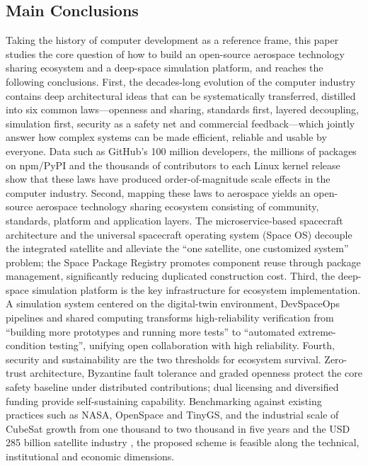 \documentclass[11pt]{article}
\begin{document}
\subsection{Main Conclusions}
Taking the history of computer development as a reference frame, this paper studies the core question of how to build an open-source aerospace technology sharing ecosystem and a deep-space simulation platform, and reaches the following conclusions. First, the decades-long evolution of the computer industry contains deep architectural ideas that can be systematically transferred, distilled into six common laws---openness and sharing, standards first, layered decoupling, simulation first, security as a safety net and commercial feedback---which jointly answer how complex systems can be made efficient, reliable and usable by everyone. Data such as GitHub's 100 million developers, the millions of packages on npm/PyPI and the thousands of contributors to each Linux kernel release show that these laws have produced order-of-magnitude scale effects in the computer industry. Second, mapping these laws to aerospace yields an open-source aerospace technology sharing ecosystem consisting of community, standards, platform and application layers. The microservice-based spacecraft architecture and the universal spacecraft operating system (Space OS) decouple the integrated satellite and alleviate the ``one satellite, one customized system'' problem; the Space Package Registry promotes component reuse through package management, significantly reducing duplicated construction cost. Third, the deep-space simulation platform is the key infrastructure for ecosystem implementation. A simulation system centered on the digital-twin environment, DevSpaceOps pipelines and shared computing transforms high-reliability verification from ``building more prototypes and running more tests'' to ``automated extreme-condition testing'', unifying open collaboration with high reliability. Fourth, security and sustainability are the two thresholds for ecosystem survival. Zero-trust architecture, Byzantine fault tolerance and graded openness protect the core safety baseline under distributed contributions; dual licensing and diversified funding provide self-sustaining capability. Benchmarking against existing practices such as NASA, OpenSpace and TinyGS, and the industrial scale of CubeSat growth from one thousand to two thousand in five years and the USD 285 billion satellite industry \cite{kulu2024,sia2024}, the proposed scheme is feasible along the technical, institutional and economic dimensions.
\end{document}
